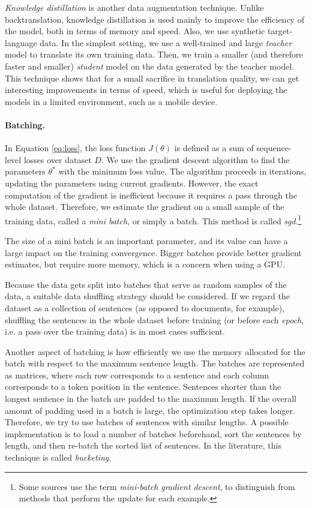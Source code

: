 \emph{Knowledge distillation} \citep{kim-rush-2016-sequence} is another data
augmentation technique. Unlike backtranslation, knowledge distillation is used
mainly to improve the efficiency of the model, both in terms of memory and
speed. Also, we use synthetic target-language data. In the simplest setting, we
use a well-trained and large \emph{teacher} model to translate its own training
data. Then, we train a smaller (and therefore faster and smaller)
\emph{student} model on the data generated by the teacher model. This technique
shows that for a small sacrifice in translation quality, we can get interesting
improvements in terms of speed, which is useful for deploying the models in a
limited environment, such as a mobile device.

\paragraph{Batching.} In Equation \ref{eq:loss}, the loss function $J(\theta)$
is defined as a sum of sequence-level losses over dataset $D$. We use the
gradient descent algorithm to find the parameters $\theta^*$ with the minimum
loss value. The algorithm proceeds in iterations, updating the parameters using
current gradients.  However, the exact computation of the gradient is
inefficient because it requires a pass through the whole dataset. Therefore, we
estimate the gradient on a small sample of the training data, called a
\emph{mini batch}, or simply a batch. This method is called
\emph{\ac{sgd}}.\footnote{Some sources use the term \emph{mini-batch gradient
    descent}, to distinguish from methods that perform the update for each
  example.}

The size of a mini batch is an important parameter, and its value can have a
large impact on the training convergence. Bigger batches provide better
gradient estimates, but require more memory, which is a concern when using a
GPU.

Because the data gets split into batches that serve as random samples of the
data, a suitable data shuffling strategy should be considered. If we regard the
dataset as a collection of sentences (as opposed to documents, for example),
shuffling the sentences in the whole dataset before training (or before each
\emph{epoch}, i.e. a pass over the training data) is in most cases sufficient.

Another aspect of batching is how efficiently we use the memory allocated for
the batch with respect to the maximum sentence length. The batches are
represented as matrices, where each row corresponds to a sentence and each
column corresponds to a token position in the sentence. Sentences shorter than
the longest sentence in the batch are padded to the maximum length. If the
overall amount of padding used in a batch is large, the optimization step takes
longer. Therefore, we try to use batches of sentences with similar lengths. A
possible implementation is to load a number of batches beforehand, sort the
sentences by length, and then re-batch the sorted list of sentences. In the
literature, this technique is called \emph{bucketing}.

